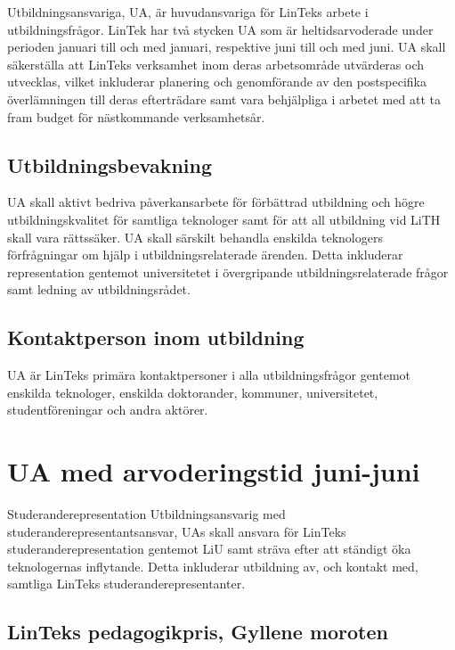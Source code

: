 Utbildningsansvariga, UA, är huvudansvariga för LinTeks arbete i
utbildningsfrågor. LinTek har två stycken UA som är heltidsarvoderade
under perioden januari till och med januari, respektive juni till och
med juni. UA skall säkerställa att LinTeks verksamhet inom deras
arbetsområde utvärderas och utvecklas, vilket inkluderar planering och
genomförande av den postspecifika överlämningen till deras efterträdare
samt vara behjälpliga i arbetet med att ta fram budget för nästkommande
verksamhetsår.

\hypertarget{utbildningsbevakning}{%
\subsection{Utbildningsbevakning}\label{utbildningsbevakning}}

UA skall aktivt bedriva påverkansarbete för förbättrad utbildning och
högre utbildningskvalitet för samtliga teknologer samt för att all
utbildning vid LiTH skall vara rättssäker. UA skall särskilt behandla
enskilda teknologers förfrågningar om hjälp i utbildningsrelaterade
ärenden. Detta inkluderar representation gentemot universitetet i
övergripande utbildningsrelaterade frågor samt ledning av
utbildningsrådet.

\hypertarget{kontaktperson-inom-utbildning}{%
\subsection{Kontaktperson inom
utbildning}\label{kontaktperson-inom-utbildning}}

UA är LinTeks primära kontaktpersoner i alla utbildningsfrågor gentemot
enskilda teknologer, enskilda doktorander, kommuner, universitetet,
studentföreningar och andra aktörer.

\hypertarget{ua-med-arvoderingstid-juni-juni}{%
\section{UA med arvoderingstid
juni-juni}\label{ua-med-arvoderingstid-juni-juni}}

Studeranderepresentation Utbildningsansvarig med
studeranderepresentantsansvar, UAs skall ansvara för LinTeks
studeranderepresentation gentemot LiU samt sträva efter att ständigt öka
teknologernas inflytande. Detta inkluderar utbildning av, och kontakt
med, samtliga LinTeks studeranderepresentanter.

\hypertarget{linteks-pedagogikpris-gyllene-moroten}{%
\subsection{LinTeks pedagogikpris, Gyllene
moroten}\label{linteks-pedagogikpris-gyllene-moroten}}

